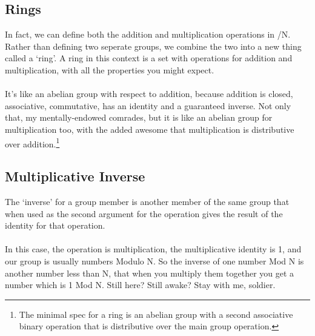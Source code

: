     \subsection{Rings}
    In fact, we can define both the addition and multiplication operations in /N. Rather than defining two seperate groups, we combine the two into a new thing called a `ring'. A ring in this context is a set with operations for addition and multiplication, with all the properties you might expect.\\
    \\
    It's like an abelian group with respect to addition, because addition is closed, associative, commutative, has an identity and a guaranteed inverse. Not only that, my mentally-endowed comrades, but it is like an abelian group for multiplication too, with the added awesome that multiplication is distributive over addition.\footnote{The minimal spec for a ring is an abelian group with a second associative binary operation that is distributive over the main group operation.}

    \subsection{Multiplicative Inverse}
    The `inverse' for a group member is another member of the same group that when used as the second argument for the operation gives the result of the identity for that operation.\\
    \\
    In this case, the operation is multiplication, the multiplicative identity is 1, and our group is usually numbers Modulo N. So the inverse of one number Mod N is another number less than N, that when you multiply them together you get a number which is 1 Mod N. Still here? Still awake? Stay with me, soldier.
    
